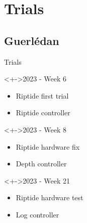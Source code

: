 \documentclass[10pt, xcolor={usenames, dvipsnames}]{beamer}
\begin{document}
    \section{Trials}

        \subsection{Guerlédan}

            \begin{frame}{Trials}
                \begin{minipage}[c]{.55\textwidth}
                    \begin{block}<+->{2023 - Week 6}
                        \vspace{2.5mm}
                        \begin{itemize}
                            \item Riptide first trial
                            \item Riptide controller
                        \end{itemize}
                    \end{block}
                    \begin{block}<+->{2023 - Week 8}
                        \begin{itemize}
                            \item Riptide hardware fix
                            \item Depth controller
                        \end{itemize}
                    \end{block}
                    \begin{block}<+->{2023 - Week 21}
                        \begin{itemize}
                            \item Riptide hardware test
                            \item Log controller
                        \end{itemize}
                    \end{block}
                \end{minipage}%
                \hfill
                \begin{minipage}[c]{.43\textwidth}
                    \centering
                    \begin{figure}
                        \centering
                        \begin{subfigure}[t]{.9\textwidth}

\end{subfigure}
\end{figure}
\end{minipage}
\end{frame}
\end{document}
